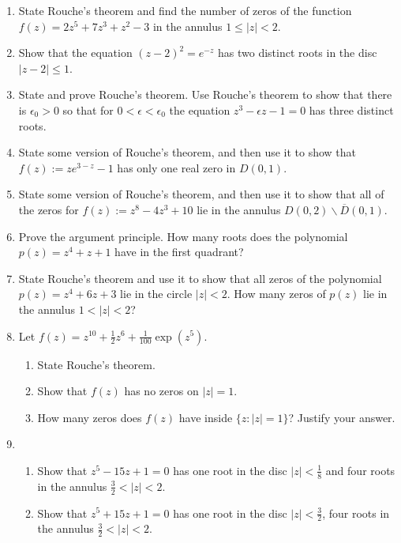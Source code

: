 \documentclass[a4paper,10pt]{article}
\begin{document}
\begin{enumerate}
	\item State Rouche's theorem and find the number of zeros of the function $f(z)=2z^{5}+7z^{3}+z^{2}-3$ in the annulus $1\le|z|<2$.
	
	\item Show that the equation $(z-2)^{2}=e^{-z}$ has two distinct roots in the disc $|z-2|\le1$.
	
	\item State and prove Rouche's theorem. Use Rouche's theorem to show that there is $\epsilon_{0}>0$ so that for $0<\epsilon<\epsilon_{0}$ the equation $z^{3}-\epsilon z-1=0$ has three distinct roots.
	
	\item State some version of Rouche's theorem, and then use it to show that $f(z):=ze^{3-z}-1$ has only one real zero in $D(0,1)$.
	
	\item State some version of Rouche's theorem, and then use it to show that all of the zeros for $f(z):=z^{8}-4z^{3}+10$ lie in the annulus $D(0,2)\backslash\overline{D}(0,1)$.
	
	\item Prove the argument principle. How many roots does the polynomial $p(z)=z^{4}+z+1$ have in the first quadrant?
	
	\item State Rouche's theorem and use it to show that all zeros of the polynomial $p(z)=z^{4}+6z+3$ lie in the circle $|z|<2$. How many zeros of $p(z)$ lie in the annulus $1<|z|<2$?
	
	\item Let $f(z)=z^{10}+\frac{1}{2}z^{6}+\frac{1}{100}\exp(z^{5})$.
	\begin{enumerate}
		\item State Rouche's theorem.
		\item Show that $f(z)$ has no zeros on $|z|=1$.
		\item How many zeros does $f(z)$ have inside $\{z:|z|=1\}$? Justify your answer.
	\end{enumerate}
	
	\item 
	\begin{enumerate}
	\item Show that $z^{5}-15z+1=0$ has one root in the disc $|z|<\frac{1}{8}$ and four roots in the annulus $\frac{3}{2}<|z|<2$.
	
	\item Show that $z^{5}+15z+1=0$ has one root in the disc $|z|<\frac{3}{2}$, four roots in the annulus $\frac{3}{2}<|z|<2$.
	\end{enumerate}
	

\end{enumerate}
\end{document}
